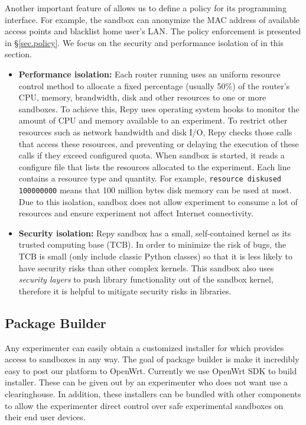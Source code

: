 Another important feature of \sandboxname allows us to define a policy for its programming interface. For example, the sandbox can anonymize the MAC address of available access points and blacklist home user's LAN. The policy enforcement is presented in \S{\ref{sec.policy}}. We focus on the security and performance isolation of \sandboxname in this section.
\begin{itemize}
\item \textbf{Performance isolation: }Each router running \sysname uses an uniform resource control method to allocate a fixed percentage (usually 50\%) of the router's CPU, memory, brandwidth, disk and other resources to one or more sandboxes. To achieve this, Repy uses operating system hooks to monitor the amount of CPU and memory available to an experiment. To restrict other resources such as network bandwidth and disk I/O, Repy checks those calls that access these resources, and preventing or delaying the execution of these calls if they exceed configured quota. When sandbox is started, it reads a configure file that lists the resources allocated to the experiment. Each line contains a resource type and quantity. For example, \texttt{resource diskused 100000000} means that 100 million bytes disk memory can be used at most. Due to this isolation, sandbox does not allow experiment to consume a lot of resources and ensure experiment not affect Internet connectivity.

\item \textbf{Security isolation: }Repy sandbox has a small, self-contained kernel as its trusted computing base (TCB). In order to minimize the risk of bugs, the TCB is small (only include classic Python classes) so that it is less likely to have security risks than other complex kernels. This sandbox also uses \textit{security layers} to push library functionality out of the sandbox kernel, therefore it is helpful to mitigate security risks in libraries. 

\end{itemize}
\subsection{Package Builder}
\label{sec.packagebuilder}
Any experimenter can easily obtain a customized installer for \sysname which provides access to sandboxes in any way. The goal of package builder is make it incredibly easy to post our platform to OpenWrt. Currently we use OpenWrt SDK to build installer. These can be given out by an experimenter who does not want use a clearinghouse. In addition, these installers can be bundled with other components to allow the experimenter direct control over safe experimental sandboxes on their end user devices.

